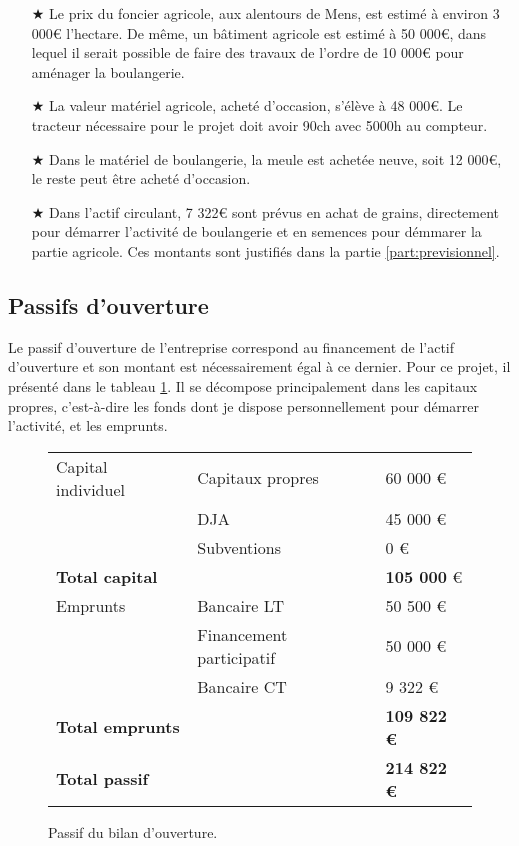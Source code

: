 \documentclass{book}
\begin{document}
\begin{itemize}
	
	\item[$\bigstar$]	Le prix du foncier agricole, aux alentours de Mens, est estimé à environ 3 000\euro{} l'hectare. De même, un bâtiment agricole est estimé à 50 000\euro{}, dans lequel il serait possible de faire des travaux de l'ordre de 10 000\euro{} pour aménager la boulangerie.
	\item[$\bigstar$] La valeur matériel agricole, acheté d'occasion, s'élève à 48 000\euro{}. Le tracteur nécessaire pour le projet doit avoir 90ch avec 5000h au compteur.
	\item[$\bigstar$] Dans le matériel de boulangerie, la meule est achetée neuve, soit 12 000\euro{}, le reste peut être acheté d'occasion.
	\item[$\bigstar$] Dans l'actif circulant, 7 322\euro{} sont prévus en achat de grains, directement pour démarrer l'activité de boulangerie et en semences pour démmarer la partie agricole. Ces montants sont justifiés dans la partie \ref{part:previsionnel}.
\end{itemize}

\subsection{Passifs d'ouverture}
\label{part:passif}

Le passif d'ouverture de l'entreprise correspond au financement de l'actif d'ouverture et son montant est nécessairement égal à ce dernier. Pour ce projet, il présenté dans le tableau \ref{tab:passif}. Il se décompose principalement dans les capitaux propres, c'est-à-dire les fonds dont je dispose personnellement pour démarrer l'activité, et les emprunts.

\begin{figure}[h!]
\footnotesize
\center
\begin{tabular}{ | p{} | p{}| p{2cm}| }

\hline
	Capital individuel & Capitaux propres & 60 000 \euro{}\\ 
	& DJA & 45 000 \euro{}\\ 
	& Subventions & 0 \euro{}\\ \hline
	\textbf{Total capital} & & \textbf{105 000} \euro{}\\ \hline
	 \hline
	Emprunts & Bancaire LT & 50 500 \euro{} \\ 
	& Financement participatif & 50 000 \euro{}\\ 
	& Bancaire CT & 9 322 \euro{}\\ \hline
	\textbf{Total emprunts} & & \textbf{109 822 \euro{}}\\ \hline
	 \hline
	\textbf{Total passif} & &\textbf{214 822 \euro{}}\\ \hline

\end{tabular}
\caption{Passif du bilan d'ouverture.}
\label{tab:passif}
\end{figure}
\end{document}
